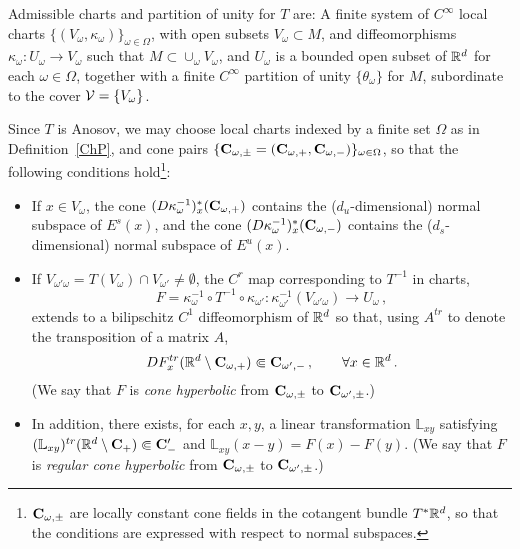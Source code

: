 \documentclass[10pt,twoside]{amsart}
\begin{document}
\begin{definition}\label{ChP}
Admissible charts and partition of unity
for $T$ are:
A finite system of $C^{\infty}$ local charts $\{(V_\omega, \kappa_\omega)\}_{\omega\in \Omega}$, with 
open subsets
$V_\omega\subset M$, and diffeomorphisms
$\kappa_\omega : U_ \omega\to V_\omega$ such that $M \subset \cup_\omega V_\omega$, and  
$U_\omega$  
is a bounded open subset of $\mathbb{R}^d$ for each $\omega\in \Omega$, together
with a  finite $C^{\infty}$ partition of  unity  $\{\theta_\omega\}$ for $M$,
   subordinate to the cover $\mathcal{V}=\{V_\omega\}$. 
\end{definition}

\begin{definition}\label{CSH}
Since $T$ is Anosov, we may choose local charts indexed by a finite set
$\Omega$ as in Definition~\ref{ChP},
and cone pairs
$
\{\mathbf{C}_{\omega,\pm}=(\mathbf{C}_{\omega,+}, \mathbf{C}_{\omega,-})\}_{\omega\in \Omega}
$, 
so   that the following conditions hold\footnote{$\mathbf{C}_{\omega,\pm}$ are  locally constant cone fields
in the cotangent bundle $T^* \mathbb{R}^d$, so that the conditions are expressed
with respect to normal subspaces.}:
\begin{itemize}
\item If $x\in V_\omega$, the cone
$(D\kappa_\omega^{-1})^{*}_x(\mathbf{C}_{\omega,+})$    
contains the ($d_u$-dimensional) normal subspace of $E^s(x)$, and the cone
$(D\kappa_\omega^{-1})^{*}_x(\mathbf{C}_{\omega,-})$
contains the ($d_s$-dimensional)
normal subspace of  $E^u(x)$.
\item 
If  $V_{\omega'\omega}=T(V_\omega)\cap V_{\omega'}\ne \emptyset$,  the $C^r$ map 
corresponding to $T^{-1}$ in charts, 
\[
F=\kappa^{-1}_\omega
\circ T^{-1}\circ \kappa_{\omega'}
:\kappa_{\omega'}^{-1}(V_{\omega'\omega}) \to U_\omega \, ,
\]
extends to a  bilipschitz $C^1$
diffeomorphism of $\mathbb{R}^d$ 
so that, using $A^{tr}$ to denote the transposition of a matrix $A$,
$$DF_{x}^{tr}(\mathbb{R}^d\setminus \mathbf{C}_{\omega,+}) \Subset \mathbf{C}_{\omega',-}\, , \qquad 
\forall x\in \mathbb{R}^d\, .
$$
(We say that $F$ is  {\it cone hyperbolic} from 
$\mathbf{C}_{\omega,\pm}$ to $\mathbf{C}_{\omega',\pm}$.)
\item
In addition, there exists, for each $x,y$,
a linear transformation $\mathbb L_{xy}$ satisfying 
$(\mathbb L_{xy})^{tr}(\mathbb{R}^d\setminus \mathbf{C}_{+}) \Subset \mathbf{C}'_{-}$
and 
$\mathbb L_{xy}(x-y)=F(x)- F(y)$. (We say that $F$ is {\it regular
 cone hyperbolic} from 
$\mathbf{C}_{\omega,\pm}$ to $\mathbf{C}_{\omega',\pm}$.)
\end{itemize}
\end{definition}
\end{document}
